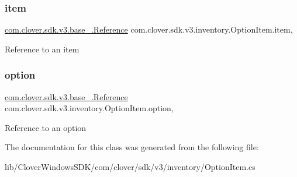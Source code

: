 \subsubsection{\texorpdfstring{item}{item}}
{\footnotesize\ttfamily \hyperlink{classcom_1_1clover_1_1sdk_1_1v3_1_1base___1_1_reference}{com.\+clover.\+sdk.\+v3.\+base\+\_\+.\+Reference} com.\+clover.\+sdk.\+v3.\+inventory.\+Option\+Item.\+item\hspace{0.3cm}{\ttfamily [get]}, {\ttfamily [set]}}



Reference to an item 

\mbox{\label{classcom_1_1clover_1_1sdk_1_1v3_1_1inventory_1_1_option_item_ab9113ba4bd277f3e8735999fab21c6ca}} 
\subsubsection{\texorpdfstring{option}{option}}
{\footnotesize\ttfamily \hyperlink{classcom_1_1clover_1_1sdk_1_1v3_1_1base___1_1_reference}{com.\+clover.\+sdk.\+v3.\+base\+\_\+.\+Reference} com.\+clover.\+sdk.\+v3.\+inventory.\+Option\+Item.\+option\hspace{0.3cm}{\ttfamily [get]}, {\ttfamily [set]}}



Reference to an option 



The documentation for this class was generated from the following file\+:\begin{DoxyCompactItemize}
\item 
lib/\+Clover\+Windows\+S\+D\+K/com/clover/sdk/v3/inventory/Option\+Item.\+cs\end{DoxyCompactItemize}
